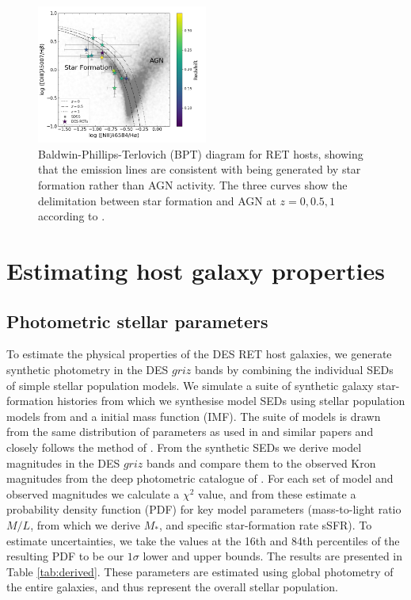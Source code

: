 \documentclass[fleqn,usenatbib,]{mnras}
\begin{document}
\begin{figure}
\includegraphics[width=0.5\textwidth]{figs/RET_BPT.png}
\caption{Baldwin-Phillips-Terlovich (BPT) diagram for RET hosts, showing that the emission lines are consistent with being generated by star formation rather than AGN activity. The three curves show the delimitation between star formation and AGN at $z =0, 0.5, 1$ according to \citet{Kewley2013}.
\label{fig:bpt}}
\end{figure}

\section{Estimating host galaxy properties}
\label{sec:measure}
\subsection{Photometric stellar parameters \label{subsec:sedfit}}
To estimate the physical properties of the DES RET host galaxies, we generate synthetic photometry in the DES $griz$ bands by combining the individual SEDs of simple stellar population models. We simulate a suite of synthetic galaxy star-formation histories from which we synthesise model SEDs using stellar population models from \citet{Bruzual2003}  and a \citet{Chabrier2003} initial mass function (IMF).  The suite of models is drawn from the same distribution of parameters as used in \citet{Kauffmann2003} and similar papers \citep[e.g.][]{Gallazzi2005,Gallazzi2009} and closely follows the method of \citet{Childress2013}. From the synthetic SEDs we derive model magnitudes in the DES $griz$ bands and compare them to the observed Kron magnitudes from the deep photometric catalogue of . For each set of model and observed magnitudes we calculate a $\chi^2$ value, and from these estimate a probability density function (PDF) for key model parameters (mass-to-light ratio $M/L$, from which we derive $M_*$, and specific star-formation rate sSFR). To estimate uncertainties, we take the values at the 16th and 84th percentiles of the resulting PDF to be our $1\sigma$ lower and upper bounds. The results are presented in Table \ref{tab:derived}. These parameters are estimated using global photometry of the entire galaxies, and thus represent the overall stellar population.
\end{document}
